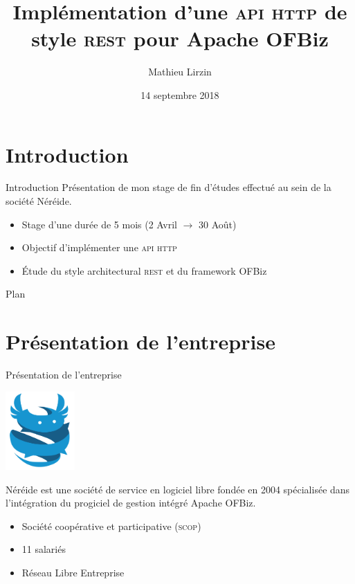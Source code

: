 \documentclass{beamer}
\title{Implémentation d'une \textsc{api http} de style \textsc{rest} pour Apache OFBiz}
\author{Mathieu Lirzin}
\date{14 septembre 2018}
\begin{document}
\begin{frame}
  \titlepage
\end{frame}

\section*{Introduction}

\begin{frame}{Introduction}
  Présentation de mon stage de fin d'études effectué au sein de la
  société Néréide.
  \begin{itemize}
  \item Stage d'une durée de 5 mois (2 Avril $\rightarrow$ 30 Août)
  \item Objectif d'implémenter une \textsc{api} \textsc{http}
  \item Étude du style architectural \textsc{rest} et du framework OFBiz
  \end{itemize}
\end{frame}

\begin{frame}{Plan}
  \tableofcontents
\end{frame}


\section{Présentation de l'entreprise}

\begin{frame}{Présentation de l'entreprise}
  \begin{center}
    \includegraphics[height=3cm]{logo_nereide}
  \end{center}
  Néréide est une société de service en logiciel libre fondée en 2004
  spécialisée dans l'intégration du progiciel de gestion intégré
  Apache OFBiz.
  \begin{itemize}
  \item Société coopérative et participative (\textsc{scop})
  \item 11 salariés
  \item Réseau Libre Entreprise
  \end{itemize}
\end{frame}
\end{document}
